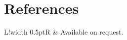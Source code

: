 \documentclass[11pt]{article}
\newcommand\VRule{\color{lightgray}\vrule width 0.5pt}
\begin{document}
%
%
%
%
%
%
%
%
\vspace{-0.5cm}
\section*{References}
\begin{tabular}{L!{\VRule}R}
     & Available on request. \\
\end{tabular}
\end{document}
